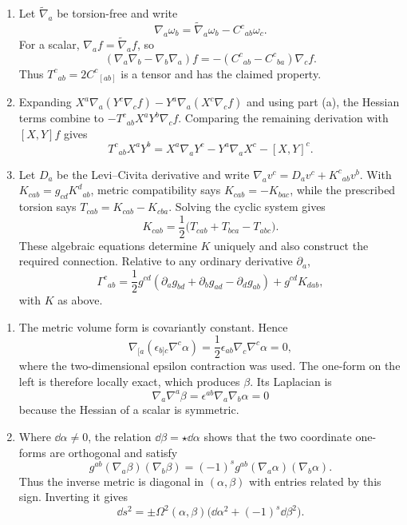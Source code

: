 \ExerciseEditorialNote

\begin{enumerate}[leftmargin=2.8em,itemsep=1.2em]
\begin{enumerate}[label=\alph*),leftmargin=2em]
\item Let \(\widetilde\nabla_a\) be torsion-free and write
\[
 \nabla_a\omega_b=\widetilde\nabla_a\omega_b-C^c{}_{ab}\omega_c.
\]
For a scalar, \(\nabla_af=\widetilde\nabla_af\), so
\[
 (\nabla_a\nabla_b-\nabla_b\nabla_a)f
 =-(C^c{}_{ab}-C^c{}_{ba})\nabla_cf.
\]
Thus \(T^c{}_{ab}=2C^c{}_{[ab]}\) is a tensor and has the claimed property.

\item Expanding \(X^a\nabla_a(Y^c\nabla_cf)-Y^a\nabla_a(X^c\nabla_cf)\)
and using part (a), the Hessian terms combine to
\(-T^c{}_{ab}X^aY^b\nabla_cf\).  Comparing the remaining derivation with
\([X,Y]f\) gives
\[
 T^c{}_{ab}X^aY^b=X^a\nabla_aY^c-Y^a\nabla_aX^c-[X,Y]^c.
\]

\item Let \(D_a\) be the Levi--Civita derivative and write
\(\nabla_av^c=D_av^c+K^c{}_{ab}v^b\).  With
\(K_{cab}=g_{cd}K^d{}_{ab}\), metric compatibility says
\(K_{cab}=-K_{bac}\), while the prescribed torsion says
\(T_{cab}=K_{cab}-K_{cba}\).  Solving the cyclic system gives
\[
 K_{cab}=\frac12\bigl(T_{cab}+T_{bca}-T_{abc}\bigr).
\]
These algebraic equations determine \(K\) uniquely and also construct the
required connection.  Relative to any ordinary derivative \(\partial_a\),
\[
 \Gamma^c{}_{ab}
 =\frac12g^{cd}(\partial_ag_{bd}+\partial_bg_{ad}-\partial_dg_{ab})
 +g^{cd}K_{dab},
\]
with \(K\) as above.
\end{enumerate}

\begin{enumerate}[label=\alph*),leftmargin=2em]
\item The metric volume form is covariantly constant.  Hence
\[
 \nabla_{[a}(\epsilon_{b]c}\nabla^c\alpha)
 =\frac12\epsilon_{ab}\nabla_c\nabla^c\alpha=0,
\]
where the two-dimensional epsilon contraction was used.  The one-form on the
left is therefore locally exact, which produces \(\beta\).  Its Laplacian is
\[
 \nabla_a\nabla^a\beta
 =\epsilon^{ab}\nabla_a\nabla_b\alpha=0
\]
because the Hessian of a scalar is symmetric.

\item Where \(\dd\alpha\ne0\), the relation
\(\dd\beta=\star\dd\alpha\) shows that the two coordinate one-forms are
orthogonal and satisfy
\[
 g^{ab}(\nabla_a\beta)(\nabla_b\beta)
 =(-1)^s g^{ab}(\nabla_a\alpha)(\nabla_b\alpha).
\]
Thus the inverse metric is diagonal in \((\alpha,\beta)\) with entries
related by this sign.  Inverting it gives
\[
 \dd s^2=\pm\Omega^2(\alpha,\beta)
 \bigl(\dd\alpha^2+(-1)^s\dd\beta^2\bigr).
\]
\end{enumerate}


\end{enumerate}
